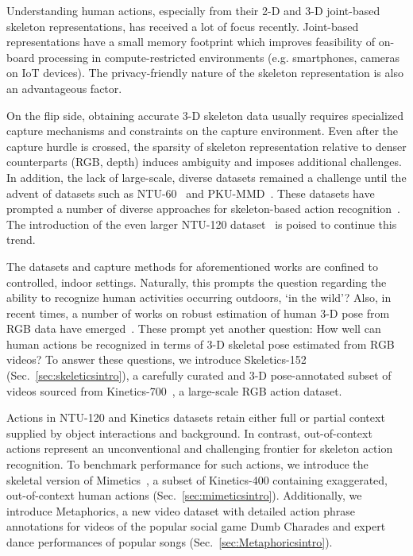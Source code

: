\documentclass[twocolumn]{svjour3}          \smartqed  \usepackage{graphicx}
\begin{document}
Understanding human actions, especially from their 2-D and 3-D joint-based skeleton representations, has received a lot of focus recently. Joint-based representations have a small memory footprint which improves feasibility of on-board processing in compute-restricted environments (e.g. smartphones, cameras on IoT devices). The privacy-friendly nature of the skeleton representation is also an advantageous factor.

On the flip side, obtaining accurate 3-D skeleton data usually requires specialized capture mechanisms and constraints on the capture environment. Even after the capture hurdle is crossed, the sparsity of skeleton representation relative to denser counterparts (RGB, depth) induces ambiguity and imposes additional challenges. In addition, the lack of large-scale, diverse datasets remained a challenge until the advent of datasets such as NTU-60~\cite{Shahroudy_2016_CVPR} and PKU-MMD~\cite{liu2017pku}. These datasets have prompted a number of diverse approaches for skeleton-based action recognition~\cite{Shi_2019_CVPR,Wu_2019_ICCV,peng2020learning,zhang2019view,2sagcn2019cvpr,song2019richly,Li_2019_CVPR}. The introduction of the even larger NTU-120 dataset~\cite{Liu_2019_NTURGBD120} is poised to continue this trend.

The datasets and capture methods for aforementioned works are confined to controlled, indoor settings. Naturally, this prompts the question regarding the ability to recognize human activities occurring outdoors, `in the wild'? Also, in recent times, a number of works on robust estimation of human 3-D pose from RGB data have emerged~\cite{kocabas2019vibe,kolotouros2019spin,RogezWS18}. These prompt yet another question: How well can human actions be recognized in terms of 3-D skeletal pose estimated from RGB videos? To answer these questions, we introduce Skeletics-152 (Sec.~\ref{sec:skeleticsintro}), a carefully curated and 3-D pose-annotated subset of videos sourced from Kinetics-700~\cite{DBLP:journals/corr/abs-1907-06987}, a large-scale RGB action dataset. 

Actions in NTU-120 and Kinetics datasets retain either full or partial context supplied by object interactions and background. In contrast, out-of-context actions represent an unconventional and challenging frontier for skeleton action recognition. To benchmark performance for such actions, we introduce the skeletal version of Mimetics~\cite{weinzaepfel2019mimetics}, a subset of Kinetics-400 containing exaggerated, out-of-context human actions (Sec.~\ref{sec:mimeticsintro}). Additionally, we introduce Metaphorics, a new video dataset with detailed action phrase annotations for videos of the popular social game Dumb Charades and expert  dance performances of popular songs (Sec.~\ref{sec:Metaphoricsintro}).
\end{document}
